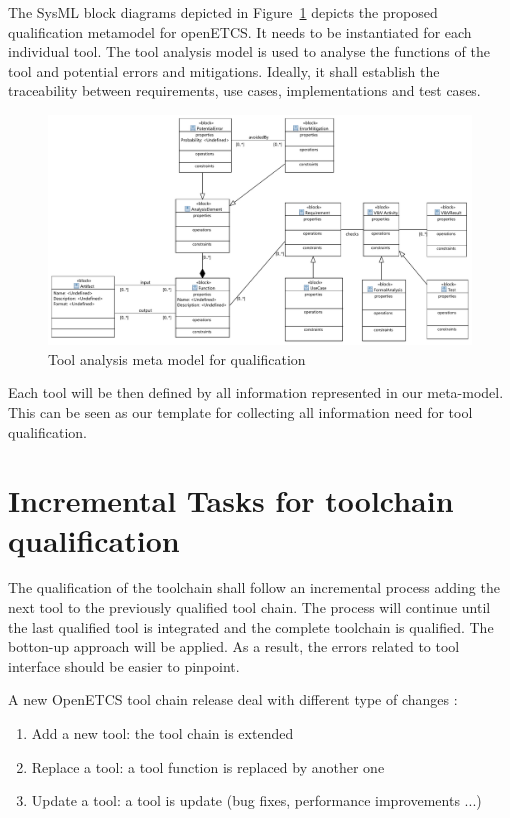 The SysML block diagrams depicted in Figure~\ref{fig:tool_analysis_model} depicts the proposed qualification metamodel for openETCS. It needs to be instantiated for each individual tool. The tool analysis model is used to analyse the functions of the tool and potential errors and mitigations. Ideally, it shall establish the traceability between requirements, use cases, implementations and test cases.


\begin{figure}
\includegraphics[width=\textwidth]{ToolAnalysisModel.pdf}
\caption{Tool analysis meta model for qualification}
\label{fig:tool_analysis_model}
\end{figure}


Each tool will be then defined by all information represented in our
meta-model. This can be seen as our template for collecting all
information need for tool qualification.





\section{Incremental Tasks for toolchain qualification}
\label{sec:incremental}
The qualification of the toolchain shall follow an incremental process
adding the next tool to the previously qualified tool chain. The
process will continue until the last qualified tool is integrated and
the complete toolchain is qualified. The botton-up approach will be
applied. As a result, the errors related to tool interface should be
easier to pinpoint.

A new  OpenETCS tool chain release deal with different type of changes :
\begin{enumerate} 
\item Add a new tool: the tool chain is extended
\item Replace a tool: a tool function is replaced by another one
\item Update a tool: a tool is update (bug fixes, performance
  improvements ...)
\end{enumerate}

